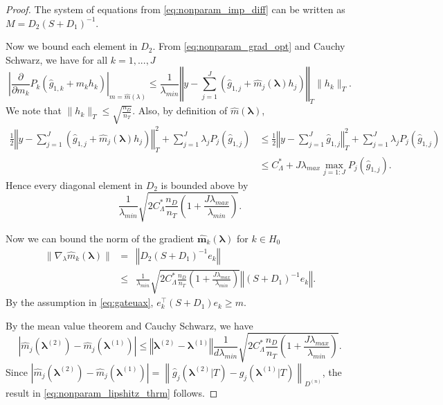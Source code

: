 \documentclass[10pt]{book}
\theoremstyle{definition}
\begin{document}
\begin{proof}
	
	The system of equations from \eqref{eq:nonparam_imp_diff} can be written as  $M=D_{2}\left(S+D_{1}\right)^{-1}$.
	
	Now we bound each element in $D_2$. From \eqref{eq:nonparam_grad_opt} and Cauchy Schwarz, we have for all $k=1,...,J$
	\begin{equation}
	\left|\frac{\partial}{\partial m_{k}}P_{k}(\hat{g}_{1,k}+m_{k}h_{k})\right|_{m=\hat{m}(\lambda)}
	\le 
	\frac{1}{\lambda_{min}}
	\left\Vert y-\sum_{j=1}^{J}\left(\hat{g}_{1,j}+\hat{m}_{j}(\boldsymbol{\lambda})h_{j}\right)
	\right\Vert _{T}\|h_{k}\|_{T}.
	\end{equation}
	We note that $\|h_{k}\|_{T} \le \sqrt{\frac{n_{D}}{n_{T}}}$. Also, by definition of $\hat{m}(\boldsymbol{\lambda})$,
	\begin{align*}
	\frac{1}{2}\left\Vert y-\sum_{j=1}^{J}\left(\hat{g}_{1,j}+\hat{m}_{j}(\boldsymbol{\lambda})h_{j}\right)\right\Vert _{T}^{2}+\sum_{j=1}^{J}\lambda_{j}P_{j}(\hat{g}_{1,j})
	& \le \frac{1}{2}\left\Vert y-\sum_{j=1}^{J}\hat{g}_{1,j}\right\Vert _{T}^{2}+\sum_{j=1}^{J}\lambda_{j}P_{j}(\hat{g}_{1,j})\\
	& \le C_{\Lambda}^* + J\lambda_{max}\max_{j=1:J}P_{j}(\hat{g}_{1,j}).
	\end{align*}
	Hence every diagonal element in $D_2$ is bounded above by
	\begin{equation}
	\frac{1}{\lambda_{min}}
	\sqrt{2C_{\Lambda}^* \frac{n_{D}}{n_{T}}\left(1+\frac{J\lambda_{max}}{\lambda_{min}}\right)}.
	\end{equation}
	
	
	Now we can bound the norm of the gradient $\boldsymbol{\hat{m}}_k(\boldsymbol{\lambda})$ for $k \in H_0$
	\begin{eqnarray}
	\|\nabla_{\lambda}\hat{m}_{k}(\boldsymbol{\lambda})\|
	& = & \left\Vert D_{2}\left(S+D_{1}\right)^{-1}e_{k}\right\Vert \\
	& \le & \frac{1}{\lambda_{min}}
	\sqrt{2C_{\Lambda}^*
		\frac{n_{D}}{n_{T}}\left(1+\frac{J\lambda_{max}}{\lambda_{min}}\right)}\left\Vert \left(S+D_{1}\right)^{-1}e_{k}\right\Vert.
	\end{eqnarray}
	By the assumption in \eqref{eq:gateuax}, $e_{k}^\top \left(S+D_{1}\right) e_{k} \ge m$.
	
	By the mean value theorem and Cauchy Schwarz, we have
	\begin{equation}
	\left|\hat{m}_{j}(\boldsymbol{\lambda}^{(2)})-\hat{m}_{j}(\boldsymbol{\lambda}^{(1)})\right| 
	\le \left\Vert \boldsymbol{\lambda}^{(2)}-\boldsymbol{\lambda}^{(1)}\right\Vert \frac{1}{d\lambda_{min}}\sqrt{2C^*_\Lambda \frac{n_{D}}{n_{T}}\left(1+\frac{J\lambda_{max}}{\lambda_{min}}\right)}.
	\end{equation}
	Since $
	\left|
	\hat{m}_{j}(\boldsymbol{\lambda}^{(2)})-\hat{m}_{j}(\boldsymbol{\lambda}^{(1)})
	\right|  =
	\left \| 
	\hat{g}_{j}(\boldsymbol{\lambda}^{(2)}|T)-\hat{g}_{j}(\boldsymbol{\lambda}^{(1)}|T)
	\right  \|_{D^{(n)}}
	$, the result in \eqref{eq:nonparam_lipshitz_thrm} follows.
\end{proof}




\end{document}
